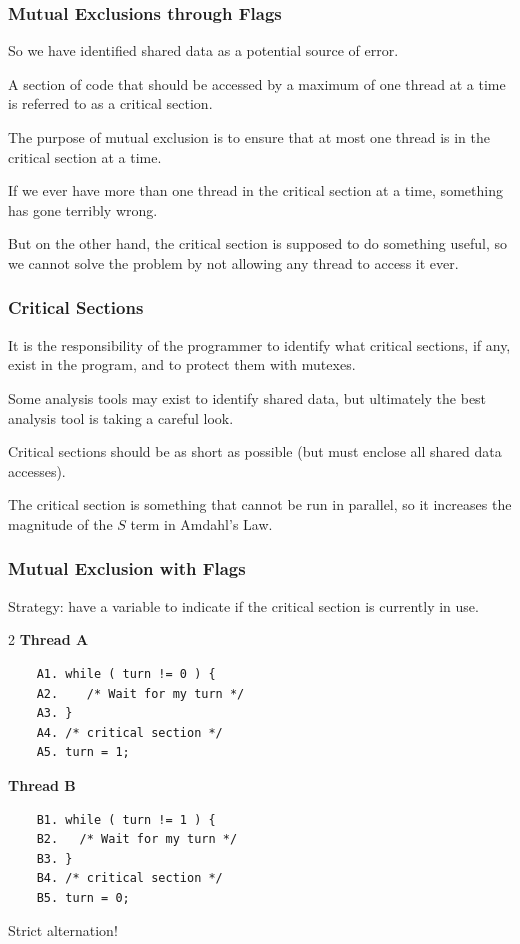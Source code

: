 \begin{frame}
	\frametitle{Mutual Exclusions through Flags}

	So we have identified shared data as a potential source of error.

	A section of code that should be accessed by a maximum of one thread at a time is referred to as a \alert{critical section}.

	The purpose of mutual exclusion is to ensure that at most one thread is in the critical section at a time.

	If we ever have more than one thread in the critical section at a time, something has gone terribly wrong.

	But on the other hand, the critical section is supposed to do something useful, so we cannot solve the problem by not allowing any thread to access it ever.

\end{frame}

\begin{frame}
	\frametitle{Critical Sections}

	It is the responsibility of the programmer to identify what critical sections, if any, exist in the program, and to protect them with mutexes.

	Some analysis tools may exist to identify shared data, but ultimately the best analysis tool is taking a careful look.

	Critical sections should be as short as possible (but must enclose all shared data accesses).

	The critical section is something that cannot be run in parallel, so it increases the magnitude of the $S$ term in Amdahl's Law.

\end{frame}

\begin{frame}[fragile]
	\frametitle{Mutual Exclusion with Flags}

	Strategy: have a variable to indicate if the critical section is currently in use.

	\begin{multicols}{2}
		\textbf{Thread A}
		\begin{verbatim}
	A1. while ( turn != 0 ) {
	A2.    /* Wait for my turn */
	A3. }
	A4. /* critical section */
	A5. turn = 1;
	\end{verbatim}
		\columnbreak
		\textbf{Thread B}
		\begin{verbatim}
	B1. while ( turn != 1 ) {
	B2.   /* Wait for my turn */
	B3. }
	B4. /* critical section */
	B5. turn = 0;
	\end{verbatim}
	\end{multicols}

	Strict alternation!

\end{frame}

